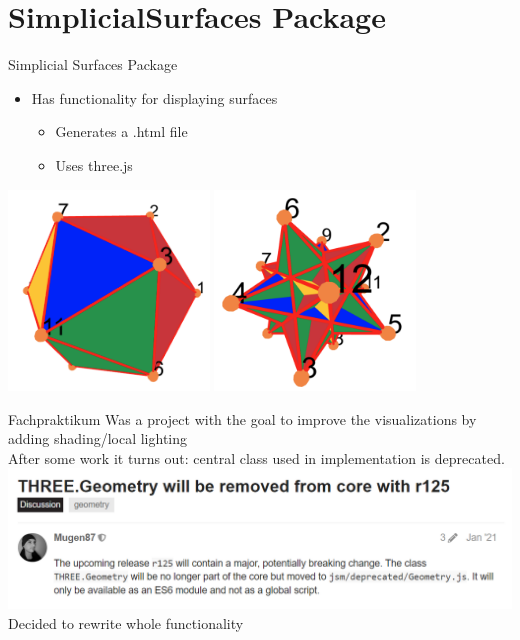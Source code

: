 \documentclass{beamer}
\numberwithin{equation}{aufgabe}
\begin{document}
\section{SimplicialSurfaces Package}
\begin{frame}{Simplicial Surfaces Package}
    \begin{itemize}[label=-]
        \item Has functionality for displaying surfaces
        \begin{itemize}[label=-]
            \item Generates a .html file
            \item Uses three.js
        \end{itemize}
    \end{itemize}
    \pause
    \begin{example}
        \includegraphics[width=0.4\textwidth]{images/ico-old.png}
        \includegraphics[width=0.4\textwidth]{images/ico2-1_old.png}
    \end{example}
\end{frame}

\begin{frame}
    \begin{exampleblock}{Fachpraktikum}
        Was a project with the goal to improve the visualizations by adding shading/local lighting
        \pause \\
        After some work it turns out: central class used in implementation is deprecated.
        \includegraphics[width=1\textwidth]{images/three-deprecated.png}
        \pause \\ 
        Decided to rewrite whole functionality
    \end{exampleblock}
\end{frame}
\end{document}
